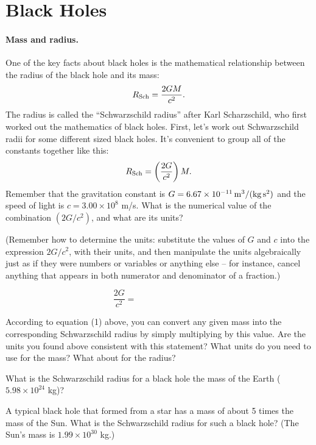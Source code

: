 \section{Black Holes}

\makelabheader

\paragraph{Mass and radius.}
One of the key facts about black holes is the mathematical relationship
between the radius of the black hole and its mass:
$$
R_{\rm Sch}=\frac{2GM}{c^2}.
$$
The radius is called the ``Schwarzschild radius'' after Karl Scharzschild,
who first worked out the mathematics of black holes.  First, let's work out
Schwarzschild radii for some different sized black holes.  It's convenient
to group all of the constants together like this:
\begin{equation}
R_{\rm Sch}=\left(\frac{2G}{c^2}\right)M.
\end{equation}
Remember that the gravitation constant is $G=6.67\times 10^{-11}\,{\rm
m^3/(kg\,s^2)}$ and the speed of light is $c=3.00\times 10^8$ m/s.
What is the numerical value of the combination $(2G/c^2)$, and what
are its units?  

(Remember how to determine the units: substitute the values of $G$
and $c$ into the expression $2G/c^2$, with their units, and then manipulate
the units algebraically just as if they were numbers or variables or anything
else -- for instance, cancel anything that appears in both numerator and
denominator of a fraction.)

\answerspace{0.3in}
$$
\frac{2G}{c^2}=\qquad\qquad\qquad\qquad
$$
\answerspace{0.3in}

According to equation (1) above, you can convert any given mass into
the corresponding Schwarzschild radius by simply multiplying by this
value.  Are the units you found above consistent with this statement?
What units do you need to use for the mass?  What about for the radius?

\answerspace{1in}

What is the Schwarzschild radius for a black hole the mass of the Earth 
($5.98\times 10^{24}$ kg)?

\answerspace{1in}

A typical black hole that formed from a star has a mass of about 5 times
the mass of the Sun.  What is the Schwarzschild radius for such
a black hole?
(The Sun's mass is $1.99\times 10^{30}$ kg.)

